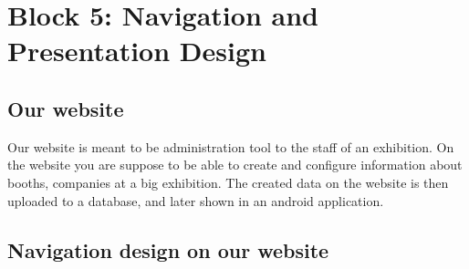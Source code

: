 \section*{Block 5: Navigation and Presentation Design}
\subsection*{Our website}
Our website is meant to be administration tool to the staff of an exhibition. On the website you are suppose to be able to create and configure information about booths, companies at a big exhibition. The created data on the website is then uploaded to a database, and later shown in an android application.

\subsection*{Navigation design on our website}



